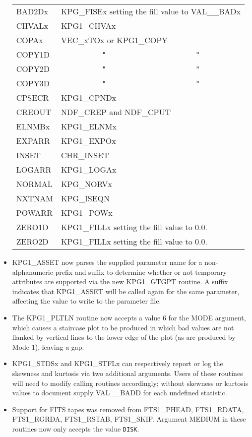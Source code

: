 \documentclass[11pt]{starlink}
\begin{document}
\begin{itemize}
\begin{tabular}{lcc}
BAD2Dx  & \multicolumn{2}{l}{KPG\_FISEx setting the fill value to VAL\_\_BADx} \\
CHVALx  & \multicolumn{2}{l}{KPG1\_CHVAx} \\
COPAx   & \multicolumn{2}{l}{VEC\_xTOx or KPG1\_COPY} \\
COPY1D  & \texttt{"}   & \texttt{"}  \\
COPY2D  & \texttt{"}   & \texttt{"}  \\
COPY3D  & \texttt{"}   & \texttt{"}  \\
CPSECR  & \multicolumn{2}{l}{KPG1\_CPNDx} \\
CREOUT  & \multicolumn{2}{l}{NDF\_CREP and NDF\_CPUT} \\
ELNMBx  & \multicolumn{2}{l}{KPG1\_ELNMx} \\
EXPARR  & \multicolumn{2}{l}{KPG1\_EXPOx} \\
INSET   & \multicolumn{2}{l}{CHR\_INSET} \\
LOGARR  & \multicolumn{2}{l}{KPG1\_LOGAx} \\
NORMAL  & \multicolumn{2}{l}{KPG\_NORVx} \\
NXTNAM  & \multicolumn{2}{l}{KPG\_ISEQN} \\
POWARR  & \multicolumn{2}{l}{KPG1\_POWx} \\
ZERO1D  & \multicolumn{2}{l}{KPG1\_FILLx setting the fill value to 0.0. } \\
ZERO2D  & \multicolumn{2}{l}{KPG1\_FILLx setting the fill value to 0.0. } \\
\end{tabular}

\item KPG1\_ASSET now parses the supplied parameter name for a
      non-alphanumeric prefix and suffix to determine whether or not
      temporary attributes are supported via the new KPG1\_GTGPT
      routine.  A suffix indicates that KPG1\_ASSET will be called
      again for the same parameter, affecting the value to write to
      the parameter file.
\item The KPG1\_PLTLN routine now accepts a value 6 for the MODE
      argument, which causes a staircase plot to be produced in which
      bad values are not flanked by vertical lines to the lower edge
      of the plot (as are produced by Mode 1), leaving a gap.
\item KPG1\_STDSx and KPG1\_STFLx can respectively report or log the
      skewness and kurtosis via two additional arguments.  Users of
      these routines will need to modify calling routines accordingly;
      without skewness or kurtosis values to document supply
      VAL\_\_BADD for each undefined statistic.
\item Support for FITS tapes was removed from FTS1\_PHEAD, FTS1\_RDATA,
      FTS1\_RGRDA, FTS1\_RSTAB, FTS1\_SKIP.  Argument MEDIUM in these
      routines now only accepts the value \texttt{DISK}.


\end{itemize}
\end{document}
